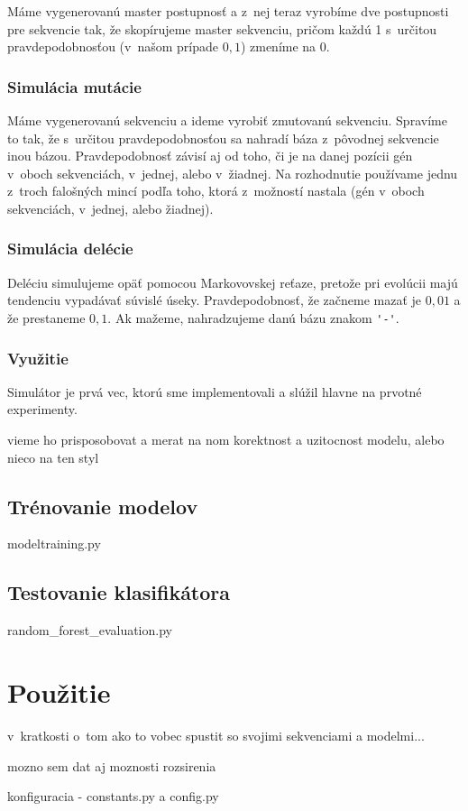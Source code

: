 
Máme vygenerovanú master postupnosť a z~nej teraz vyrobíme dve postupnosti pre sekvencie tak, že skopírujeme master sekvenciu, pričom každú 1 s~určitou pravdepodobnosťou (v~našom prípade $0,1$) zmeníme na 0.

\subsubsection{Simulácia mutácie}

Máme vygenerovanú sekvenciu a ideme vyrobiť zmutovanú sekvenciu. Spravíme to tak, že s~určitou pravdepodobnosťou sa nahradí báza z~pôvodnej sekvencie inou bázou. Pravdepodobnosť závisí aj od toho, či je na danej pozícii gén v~oboch sekvenciách, v~jednej, alebo v~žiadnej. Na rozhodnutie používame jednu z~troch falošných mincí podľa toho, ktorá z~možností nastala (gén v~oboch sekvenciách, v~jednej, alebo žiadnej).

\subsubsection{Simulácia delécie}
Deléciu simulujeme opäť pomocou Markovovskej reťaze, pretože pri evolúcii majú tendenciu vypadávať súvislé úseky. Pravdepodobnosť, že začneme mazať je $0,01$ a že prestaneme $0,1$.
Ak mažeme, nahradzujeme danú bázu znakom {\verb+'-'+}.

\subsubsection{Využitie}

Simulátor je prvá vec, ktorú sme implementovali a slúžil hlavne na prvotné experimenty.

\todo vieme ho prisposobovat a merat na nom korektnost a uzitocnost modelu, alebo nieco na ten styl

\subsection{Trénovanie modelov}
\todo modeltraining.py

\subsection{Testovanie klasifikátora}
\todo random\_forest\_evaluation.py

\section{Použitie}
\todo v~kratkosti o~tom ako to vobec spustit so svojimi sekvenciami a modelmi...

\todo mozno sem dat aj moznosti rozsirenia

\todo konfiguracia - constants.py a config.py
